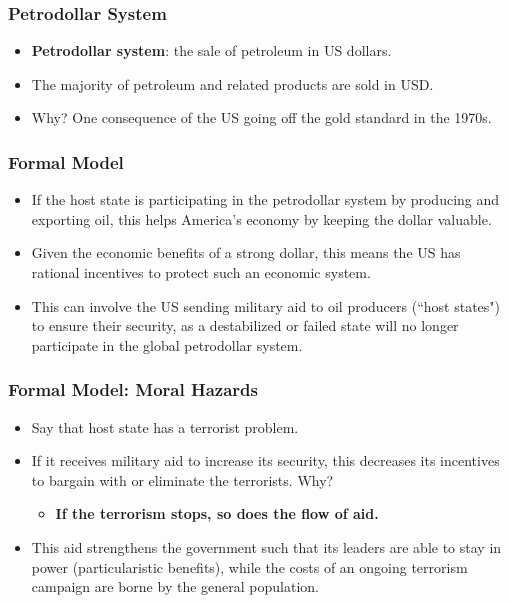 \documentclass[handout]{beamer}
\begin{document}
\begin{frame} 
	\frametitle{\LARGE{Petrodollar System}}
	\begin{itemize}
		\item \textbf{Petrodollar system}: the sale of petroleum in US dollars. \pause
		\item The majority of petroleum and related products are sold in USD. \pause
		\item Why? One consequence of the US going off the gold standard in the 1970s. 
	\end{itemize}
\end{frame}

\begin{frame} 
	\frametitle{\LARGE{Formal Model}}
	\begin{itemize}
		\item If the host state is participating in the petrodollar system by producing and exporting oil, this helps America's economy by keeping the dollar valuable. \pause
		\item Given the economic benefits of a strong dollar, this means the US has rational incentives to protect such an economic system. \pause
		\item This can involve the US sending military aid to oil producers (``host states") to ensure their security, as a destabilized or failed state will no longer participate in the global petrodollar system.
	\end{itemize}
\end{frame}

\begin{frame} 
	\frametitle{\LARGE{Formal Model: Moral Hazards}}
	\begin{itemize}
		\item Say that host state has a terrorist problem. \pause
		\item If it receives military aid to increase its security, this decreases its incentives to bargain with or eliminate the terrorists. Why? \pause
		\begin{itemize}
			\item \textbf{If the terrorism stops, so does the flow of aid.}
		\end{itemize}
		\item This aid strengthens the government such that its leaders are able to stay in power (particularistic benefits), while the costs of an ongoing terrorism campaign are borne by the general population.
	\end{itemize}
\end{frame}
\end{document}
